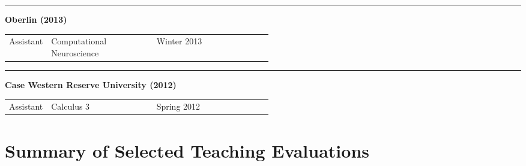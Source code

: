 \documentclass[a4paper,11pt]{article}
\begin{document}
\noindent\rule{15cm}{0.4pt}

\textbf{Oberlin (2013)}

\begin{tabular}{p{0.11\linewidth}p{0.4\linewidth}p{.2\linewidth}}
	 Assistant & Computational Neuroscience  & Winter 2013 
\end{tabular}

\noindent\rule{15cm}{0.4pt}

\textbf{Case Western Reserve University (2012)}

\begin{tabular}{p{0.11\linewidth}p{0.4\linewidth}p{.2\linewidth}}
	Assistant & Calculus 3  & Spring 2012
\end{tabular}





\section{Summary of Selected Teaching Evaluations}

 
\end{document}
